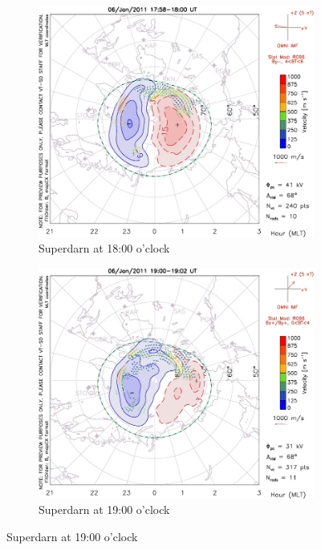 \documentclass[10pt,a4paper]{article}
\begin{document}
\begin{figure}[h]
\centering
\begin{subfigure}{0.3\textwidth}
\centering
	\includegraphics[width=\textwidth]{Superdarn1.jpg}
	\caption{ Superdarn at 18:00 o'clock \label{Super_18}}
\end{subfigure}
\begin{subfigure}{0.3\textwidth}
\centering
	\includegraphics[width=\textwidth]{Superdarn2.jpg}
	\caption{ Superdarn at 19:00 o'clock \label{Super_19}}
\end{subfigure}

\end{figure}
\end{document}
